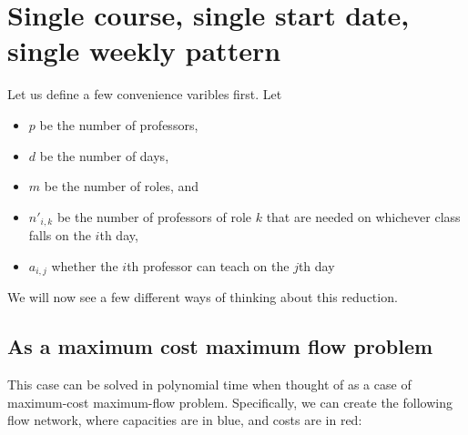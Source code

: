 \section{Single course, single start date, single weekly pattern}
Let us define a few convenience varibles first. Let
\begin{itemize}
\item $p$ be the number of professors,
\item $d$ be the number of days,
\item $m$ be the number of roles, and
\item $n'_{i, k}$ be the number of professors of role $k$ that are needed on whichever class falls on the $i$th day,
\item $a_{i, j}$ whether the $i$th professor can teach on the $j$th day
\end{itemize}

We will now see a few different ways of thinking about this reduction.
\subsection{As a maximum cost maximum flow problem}

This case can be solved in polynomial time when thought of as a case of maximum-cost maximum-flow problem. Specifically, we can create the following flow network, where capacities are in blue, and costs are in red:

